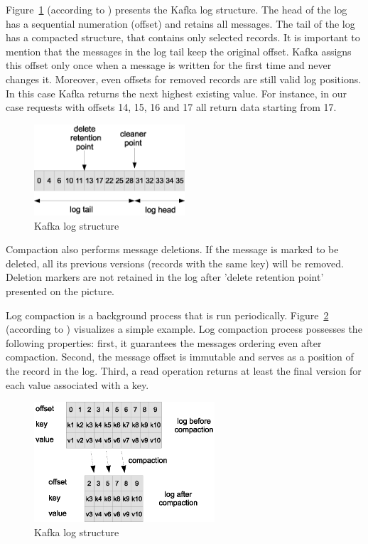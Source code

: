 Figure~\ref{fig:kafka_log_structure} (according to \cite{Kafka}) presents the Kafka log structure. 
The head of the log has a sequential numeration (offset) and retains all messages.
The tail of the log has a compacted structure, that contains only selected records.
It is important to mention that the messages in the log tail keep the original offset.
Kafka assigns this offset only once when a message is written for the first time and never changes it.
Moreover, even offsets for removed records are still valid log positions.
In this case Kafka returns the next highest existing value.
For instance, in our case requests with offsets 14, 15, 16 and 17 all return data starting from 17.

\begin{figure}[h]
  \centering
  \includegraphics [width=0.5\textwidth]{images/kafka_log_structure}
  \caption{Kafka log structure}
  \label{fig:kafka_log_structure}
\end{figure} 

Compaction also performs message deletions.
If the message is marked to be deleted, all its previous versions (records with the same key) will be removed.
Deletion markers are not retained in the log after 'delete retention point' presented on the picture.

Log compaction is a background process that is run periodically.
Figure~\ref{fig:log_compaction_process} (according to \cite{Kafka}) visualizes a simple example.
Log compaction process possesses the following properties:
first, it guarantees the messages ordering even after compaction.
Second, the message offset is immutable and serves as a position of the record in the log.
Third, a read operation returns at least the final version for each value associated with a key.

\begin{figure}[h]
  \centering
  \includegraphics [width=0.6\textwidth]{images/log_compaction_process}
  \caption{Kafka log structure}
  \label{fig:log_compaction_process}
\end{figure} 

